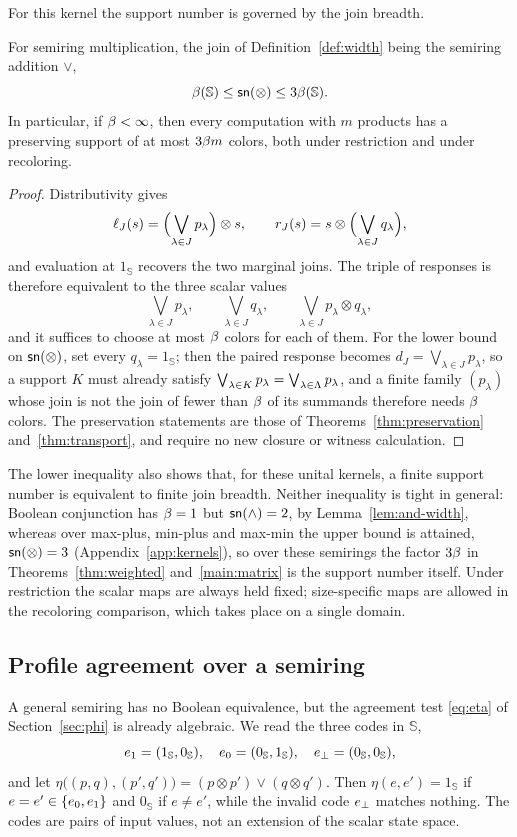 For this kernel the support number is governed by the join breadth.
\begin{proposition}\label{prop:semiring-width}
For semiring multiplication, the join of Definition~\ref{def:width} being
the semiring addition $\vee$,
\[
 \beta(\mathbb S)\le\mathsf{sn}(\otimes)\le3\beta(\mathbb S).
\]
In particular, if $\beta<\infty$, then every computation with $m$
products has a preserving support of at most $3\beta m$ colors, both
under restriction and under recoloring.
\end{proposition}
\begin{proof}
Distributivity gives
\[
 \ell_J(s)=\Bigl(\bigvee_{\lambda\in J}p_\lambda\Bigr)\otimes s,
 \qquad r_J(s)=s\otimes\Bigl(\bigvee_{\lambda\in J}q_\lambda\Bigr),
\]
and evaluation at $1_{\mathbb S}$ recovers the two marginal joins. The
triple of responses is therefore equivalent to the three scalar values
\[
 \bigvee_{\lambda\in J}p_\lambda,\qquad
 \bigvee_{\lambda\in J}q_\lambda,\qquad
 \bigvee_{\lambda\in J}p_\lambda\otimes q_\lambda,
\]
and it suffices to choose at most $\beta$ colors for each of them. For
the lower bound on $\mathsf{sn}(\otimes)$, set every $q_\lambda=1_{\mathbb S}$; then
the paired response becomes $d_J=\bigvee_{\lambda\in J}p_\lambda$, so a
support $K$ must already satisfy
$\bigvee_{\lambda\in K}p_\lambda=\bigvee_{\lambda\in\Lambda}p_\lambda$, and a
finite family $(p_\lambda)$ whose join is not the join of fewer than
$\beta$ of its summands therefore needs $\beta$ colors. The
preservation statements are those of Theorems~\ref{thm:preservation}
and~\ref{thm:transport}, and require no new closure or witness calculation.
\end{proof}
The lower inequality also shows that, for these unital kernels, a finite
support number is equivalent to finite join breadth. Neither inequality is
tight in general: Boolean conjunction has $\beta=1$ but $\mathsf{sn}(\land)=2$, by
Lemma~\ref{lem:and-width}, whereas over max-plus, min-plus and max-min the
upper bound is attained, $\mathsf{sn}(\otimes)=3$ (Appendix~\ref{app:kernels}), so
over these semirings the factor $3\beta$ in Theorems~\ref{thm:weighted}
and~\ref{main:matrix} is the support number itself. Under restriction the
scalar maps are always held fixed; size-specific maps are allowed in the
recoloring comparison, which takes place on a single domain.

\subsection{Profile agreement over a semiring}\label{semi:weighted-section}
A general semiring has no Boolean equivalence, but the agreement test
\eqref{eq:eta} of Section~\ref{sec:phi} is already algebraic. We read the
three codes in $\mathbb S$,
\[
 e_{1}=(1_{\mathbb S},0_{\mathbb S}),\quad
 e_{0}=(0_{\mathbb S},1_{\mathbb S}),\quad
 e_{\bot}=(0_{\mathbb S},0_{\mathbb S}),
\]
and let $\eta\bigl((p,q),(p',q')\bigr)=(p\otimes p')\vee(q\otimes q')$. Then
$\eta(e,e')=1_{\mathbb S}$ if $e=e'\in\{e_{0},e_{1}\}$ and $0_{\mathbb S}$ if
$e\ne e'$, while the invalid code $e_{\bot}$ matches nothing. The codes are
pairs of input values, not an extension of the scalar state space.

